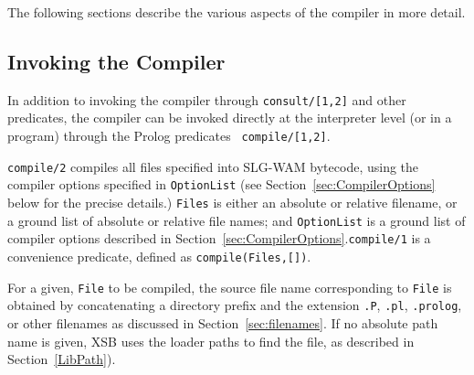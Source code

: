 The following sections describe the various aspects of the compiler 
in more detail.


\subsection{Invoking the Compiler} \label{compiler_invoking}

In addition to invoking the compiler through {\tt consult/[1,2]} and
other predicates, the compiler can be invoked directly at the
interpreter level (or in a program) through the Prolog predicates {\tt
  compile/[1,2]}.

\begin{description}
%
{\tt compile/2} compiles all files specified into SLG-WAM bytecode,
using the compiler options specified in {\tt OptionList} (see
Section~\ref{sec:CompilerOptions} below for the precise details.)
{\tt Files} is either an absolute or relative filename, or a ground
list of absolute or relative file names; and {\tt OptionList} is a
ground list of compiler options described in
Section~\ref{sec:CompilerOptions}.{\tt compile/1} is a convenience
predicate, defined as {\tt compile(Files,[])}.

For a given, {\tt File} to be compiled, the source file name
corresponding to {\tt File} is obtained by concatenating a directory
prefix and the extension {\tt .P}, {\tt .pl}, {\tt .prolog}, or other
filenames as discussed in Section~\ref{sec:filenames}.  If no absolute
path name is given, XSB uses the loader paths to find the file, as
described in Section~\ref{LibPath}).


\end{description}
